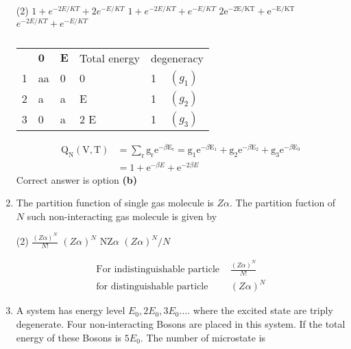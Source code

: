 \begin{enumerate}
	 \begin{tasks}(2)
		\task[\textbf{a.}]$1+e^{-2 E / K T}+2 e^{-E / K T}$
		\task[\textbf{b.}] $1+e^{-2 E / K T}+e^{-E / K T}$
		\task[\textbf{c.}]$2 \mathrm{e}^{-2 \mathrm{E} / \mathrm{KT}}+\mathrm{e}^{-\mathrm{E} / \mathrm{KT}}$
		\task[\textbf{d.}] $e^{-2 E / K T}+e^{-E / K T}$
	\end{tasks}
	\begin{answer}$\left. \right. $\\
		\renewcommand*{\arraystretch}{2}
		\begin{tabular}{llllll} 
			& $\mathbf{0}$ & $\mathbf{E}$ & Total energy & \multicolumn{2}{c}{ degeneracy } \\
			1 & aa & 0 & 0 & 1 & $\left(g_{1}\right)$ \\
			2 & a & a & E & 1 & $\left(g_{2}\right)$ \\
			3 & 0 & a & 2 E & 1 & $\left(g_{3}\right)$
		\end{tabular}
	\begin{align*}
	\mathrm{Q}_{\mathrm{N}}(\mathrm{V}, \mathrm{T})&=\sum_{\mathrm{r}} \mathrm{g}_{\mathrm{r}} \mathrm{e}^{-\beta \mathrm{E}_{\mathrm{r}}}=\mathrm{g}_{1} \mathrm{e}^{-\beta \mathrm{E}_{1}}+\mathrm{g}_{2} \mathrm{e}^{-\beta \mathrm{E}_{2}}+\mathrm{g}_{3} \mathrm{e}^{-\beta \mathrm{E}_{3}}\\
	&=1+\mathrm{e}^{-\beta E}+\mathrm{e}^{-2 \beta E}
	\end{align*}
	Correct answer is option \textbf{(b)}
	\end{answer}
	\item The partition function of single gas molecule is $Z\alpha$. The partition fuction of $N$ such non-interacting gas molecule is given by
	 \begin{tasks}(2)
		\task[\textbf{a.}]$\frac{(Z \alpha)^{N}}{N !}$
		\task[\textbf{b.}]$(Z \alpha)^{N}$
		\task[\textbf{c.}] $\mathrm{NZ} \alpha$
		\task[\textbf{d.}] $(Z \alpha)^{N} / N$
	\end{tasks}
	\begin{answer}
		\begin{align*}
		\text{For indistinguishable particle }&\frac{(Z \alpha)^{N}}{N !}\\
		\text{for distinguishable particle }&(Z \alpha)^{N}
		\end{align*}
	\end{answer}
	\item A system has energy level $E_0,2E_0,3E_0....$ where the excited state are triply degenerate. Four non-interacting Bosons are placed in this system. If the total energy of these Bosons is $5E_0$. The number of microstate is 

\end{enumerate}
